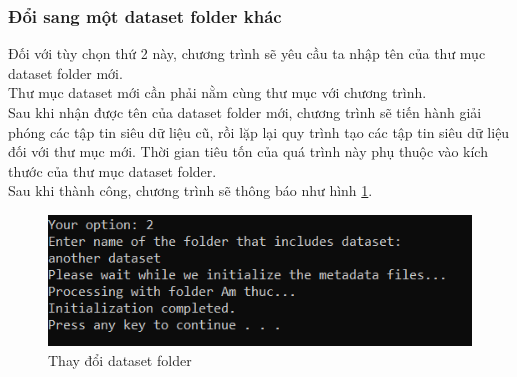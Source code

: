 \documentclass[12pt,a4paper]{article}
\begin{document}
\subsubsection{Đổi sang một dataset folder khác}
Đối với tùy chọn thứ 2 này, chương trình sẽ yêu cầu ta nhập tên của thư mục dataset folder mới. \\
Thư mục dataset mới cần phải nằm cùng thư mục với chương trình.\\
Sau khi nhận được tên của dataset folder mới, chương trình sẽ tiến hành giải phóng các tập tin siêu dữ liệu cũ, rồi lặp lại quy trình tạo các tập tin siêu dữ liệu đối với thư mục mới. Thời gian tiêu tốn của quá trình này phụ thuộc vào kích thước của thư mục dataset folder.\\
Sau khi thành công, chương trình sẽ thông báo như hình \ref{Fig20}.
\begin{figure}[H]
\begin{center}
\includegraphics[scale=1]{Fig20}
\end{center}
\caption{Thay đổi dataset folder}
\label{Fig20}
\end{figure}
\end{document}
